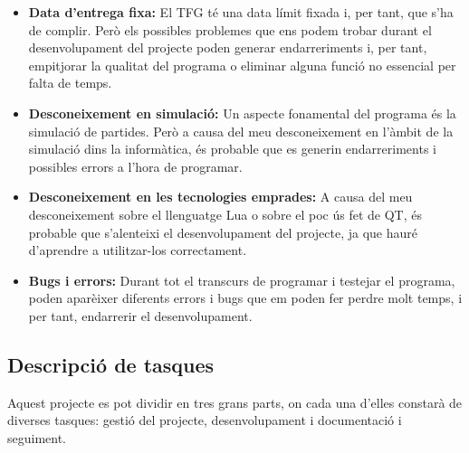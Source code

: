 \documentclass[a4paper]{article}
\begin{document}
\begin{itemize}
    \item \textbf{Data d'entrega fixa:} El TFG té una data límit fixada i, per tant, que s'ha de complir. Però els possibles problemes que ens podem trobar durant el desenvolupament del projecte poden generar endarreriments i, per tant, empitjorar la qualitat del programa o eliminar alguna funció no essencial per falta de temps.
    \item \textbf{Desconeixement en simulació:} Un aspecte fonamental del programa és la simulació de partides. Però a causa del meu desconeixement en l'àmbit de la simulació dins la informàtica, és probable que es generin endarreriments i possibles errors a l'hora de programar.
    \item \textbf{Desconeixement en les tecnologies emprades:} A causa del meu desconeixement sobre el llenguatge Lua o sobre el poc ús fet de QT, és probable que s'alenteixi el desenvolupament del projecte, ja que hauré d'aprendre a utilitzar-los correctament.
    \item \textbf{Bugs i errors:} Durant tot el transcurs de programar i testejar el programa, poden aparèixer diferents errors i bugs que em poden fer perdre molt temps, i per tant, endarrerir el desenvolupament.
\end{itemize}

\subsection{Descripció de tasques}
Aquest projecte es pot dividir en tres grans parts, on cada una d'elles constarà de diverses tasques: gestió del projecte, desenvolupament i documentació i seguiment.
\end{document}
